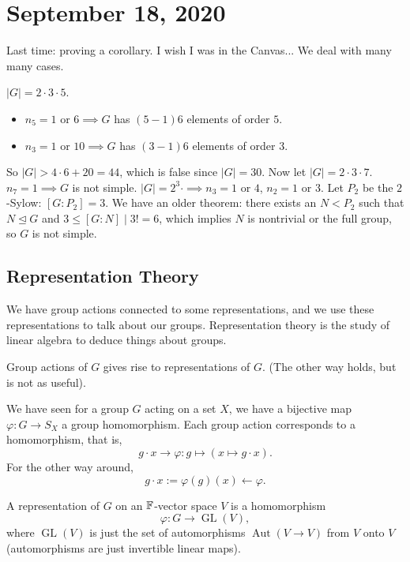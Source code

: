 \section{September 18, 2020}
Last time: proving a corollary. I wish I was in the Canvas... We deal with many many cases.
\begin{example}
$|G|=2\cdot 3\cdot 5$. 
    \begin{itemize}
        \item $n_5=1$ or $6 \implies G$ has $(5-1)6$ elements of order $5$.
        \item $n_3=1$ or $10 \implies G$ has $(3-1)6$ elements of order $3$.
    \end{itemize}
    So  $|G|>4\cdot 6+20=44$, which is false since $|G|=30$. Now let $|G|=2\cdot 3\cdot 7$. $n_7=1\implies G$ is not simple. $|G|=2^3\cdot \implies n_3=1$ or $4$, $n_2=1$ or $3$. Let $P_2$ be the $2$-Sylow: $[G:P_2]=3$. We have an older theorem: there exists an $N<P_2$ such that $N\trianglelefteq G$ and $3\leq[G:N]  \mid 3!=6$, which implies $N$ is nontrivial or the full group, so $G$ is not simple.
\end{example}

\subsection{Representation Theory}
We have group actions connected to some representations, and we use these representations to talk about our groups. Representation theory is the study of linear algebra to deduce things about groups.

\begin{claim}
    Group actions of $G$ gives rise to representations of $G$. (The other way holds, but is not as useful).
\end{claim}
We have seen for a group $G$ acting on a set $X$, we have a bijective map $\varphi \colon G \to S_X$ a group homomorphism. Each group action corresponds to a homomorphism, that is, \[
    g\cdot x \longrightarrow \varphi \colon g \mapsto (x\mapsto g\cdot x).
\] For the other way around, \[
g\cdot x:= \varphi (g)(x)\longleftarrow \varphi .
\] 
\begin{definition}[Representations]
    A representation of $G$ on an $\mathbb{F}$-vector space $V$ is a homomorphism  \[
        \varphi \colon G \to \operatorname{GL}(V),
    \] where $\operatorname{GL}(V)$ is just the set of automorphisms $\operatorname{Aut}(V\to V)$ from $V$ onto $V$ (automorphisms are just invertible linear maps). 
\end{definition}

